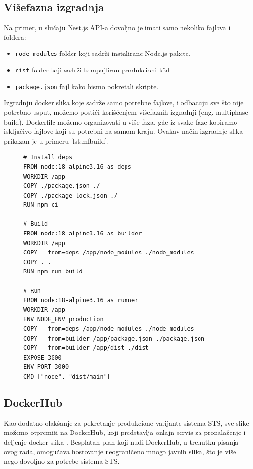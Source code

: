 \documentclass[12pt,oneside]{memoir}
\begin{document}
\subsection{Višefazna izgradnja}
Na primer, u slučaju Nest.js API-a dovoljno je imati samo nekoliko fajlova i foldera: 
\begin{itemize}
    \item \verb|node_modules| folder koji sadrži instalirane Node.js pakete.
    \item \verb|dist| folder koji sadrži kompajliran produkcioni k\^{o}d.
    \item \verb|package.json| fajl kako bismo pokretali skripte.
\end{itemize}

Izgradnju docker slika koje sadrže samo potrebne fajlove, i odbacuju sve što nije potrebno usput, možemo postići korišćenjem višefaznih izgradnji (eng. multiphase build). Dockerfile možemo organizovati u više faza, gde iz svake faze kopiramo isključivo fajlove koji su potrebni na samom kraju. Ovakav način izgradnje slika prikazan je u primeru \ref{lst:mfbuild}.

\begin{figure}[h]
\begin{lstlisting}[language=docker, caption={Višefazna izgradnja slike za API servis.}, label={lst:mfbuild}]
# Install deps
FROM node:18-alpine3.16 as deps
WORKDIR /app
COPY ./package.json ./
COPY ./package-lock.json ./
RUN npm ci

# Build
FROM node:18-alpine3.16 as builder
WORKDIR /app
COPY --from=deps /app/node_modules ./node_modules
COPY . .
RUN npm run build

# Run
FROM node:18-alpine3.16 as runner
WORKDIR /app
ENV NODE_ENV production
COPY --from=deps /app/node_modules ./node_modules
COPY --from=builder /app/package.json ./package.json
COPY --from=builder /app/dist ./dist
EXPOSE 3000
ENV PORT 3000
CMD ["node", "dist/main"]
\end{lstlisting}
\end{figure}

\newpage
\subsection{DockerHub}

Kao dodatno olakšanje za pokretanje produkcione varijante sistema STS, sve slike možemo otpremiti na DockerHub, koji predstavlja onlajn servis za pronalaženje i deljenje docker slika \cite{dockerhubdocs}. Besplatan plan koji nudi DockerHub, u trenutku pisanja ovog rada, omogućava hostovanje neograničeno mnogo javnih slika, što je više nego dovoljno za potrebe sistema STS. 
\end{document}
